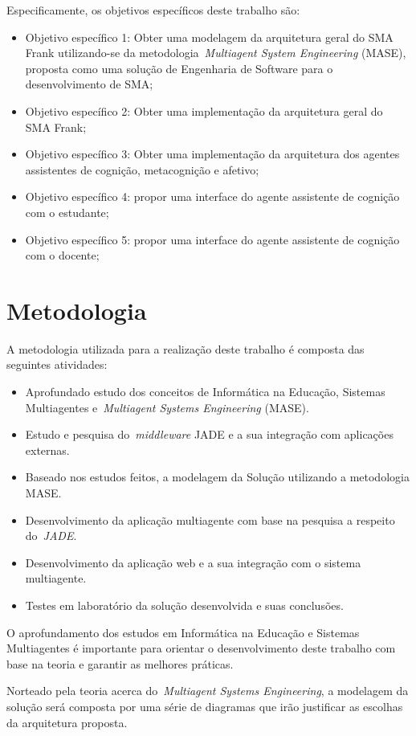 Especificamente, os objetivos específicos deste trabalho são:
\begin{itemize}
 	\item Objetivo específico 1: Obter uma modelagem da arquitetura geral do SMA Frank utilizando-se da metodologia~\emph{Multiagent System Engineering} (MASE), proposta como uma solução de Engenharia de Software para o desenvolvimento de SMA;
	\item Objetivo específico 2: Obter uma implementação da arquitetura geral do SMA Frank;
	\item Objetivo específico 3: Obter uma implementação da arquitetura dos agentes assistentes de cognição, metacognição e afetivo;
	\item Objetivo específico 4: propor uma interface do agente assistente de cognição com o estudante;
	\item Objetivo específico 5: propor uma interface do agente assistente de cognição com o docente;
\end{itemize}

\section{Metodologia}
A metodologia utilizada para a realização deste trabalho é composta das seguintes atividades:
\begin{itemize}
 	\item Aprofundado estudo dos conceitos de Informática na Educação, Sistemas Multiagentes e~\emph{Multiagent Systems Engineering} (MASE).
	\item Estudo e pesquisa do~\emph{middleware} JADE e a sua integração com aplicações externas.
	\item Baseado nos estudos feitos, a modelagem da Solução utilizando a metodologia MASE.
	\item Desenvolvimento da aplicação multiagente com base na pesquisa a respeito do~\emph{JADE}.
	\item Desenvolvimento da aplicação web e a sua integração com o sistema multiagente.
	\item Testes em laboratório da solução desenvolvida e suas conclusões.
\end{itemize}

O aprofundamento dos estudos em Informática na Educação e Sistemas Multiagentes é importante para orientar o desenvolvimento deste trabalho com base na teoria e garantir as melhores práticas.

Norteado pela teoria acerca do~\emph{Multiagent Systems Engineering}, a modelagem da solução será composta por uma série de diagramas que irão justificar as escolhas da arquitetura proposta.

